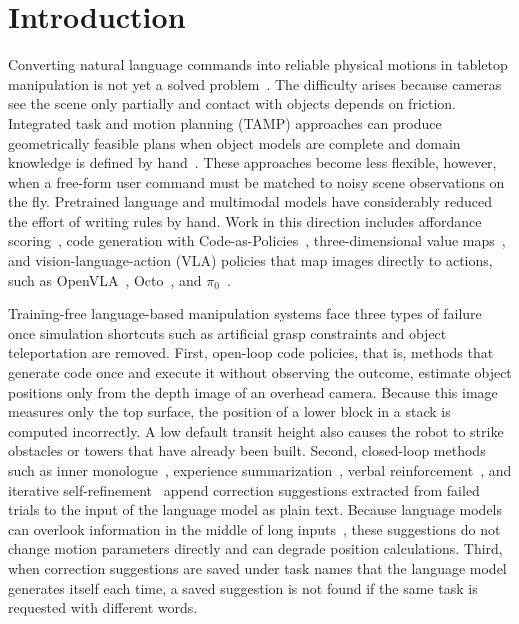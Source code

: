 \documentclass[preprint,12pt]{elsarticle}
\begin{document}
\section{Introduction}

Converting natural language commands into reliable physical motions in tabletop manipulation is not yet a solved problem~\cite{billard2019trends,kroemer2021review}. The difficulty arises because cameras see the scene only partially and contact with objects depends on friction. Integrated task and motion planning (TAMP) approaches can produce geometrically feasible plans when object models are complete and domain knowledge is defined by hand~\cite{garrett2021tamp}. These approaches become less flexible, however, when a free-form user command must be matched to noisy scene observations on the fly. Pretrained language and multimodal models have considerably reduced the effort of writing rules by hand. Work in this direction includes affordance scoring~\cite{ahn2022saycan}, code generation with Code-as-Policies~\cite{liang2023cap,singh2023progprompt}, three-dimensional value maps~\cite{huang2023voxposer}, and vision-language-action (VLA) policies that map images directly to actions, such as OpenVLA~\cite{kim2024openvla}, Octo~\cite{ghosh2024octo}, and $\pi_0$~\cite{black2025pi0}.

Training-free language-based manipulation systems face three types of failure once simulation shortcuts such as artificial grasp constraints and object teleportation are removed. First, open-loop code policies, that is, methods that generate code once and execute it without observing the outcome, estimate object positions only from the depth image of an overhead camera. Because this image measures only the top surface, the position of a lower block in a stack is computed incorrectly. A low default transit height also causes the robot to strike obstacles or towers that have already been built. Second, closed-loop methods such as inner monologue~\cite{huang2022inner}, experience summarization~\cite{liu2023reflect}, verbal reinforcement~\cite{shinn2023reflexion}, and iterative self-refinement~\cite{madaan2023selfrefine} append correction suggestions extracted from failed trials to the input of the language model as plain text. Because language models can overlook information in the middle of long inputs~\cite{liu2024lost}, these suggestions do not change motion parameters directly and can degrade position calculations. Third, when correction suggestions are saved under task names that the language model generates itself each time, a saved suggestion is not found if the same task is requested with different words.
\end{document}
